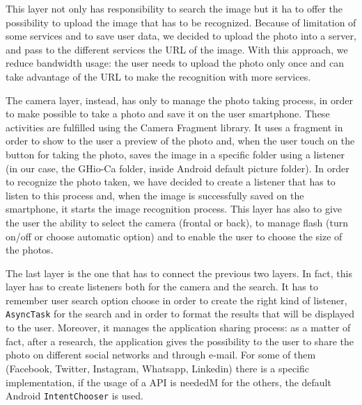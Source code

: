 This layer not only has responsibility to search the image but it ha to offer the possibility to upload the image that has to be recognized. Because of limitation of some services and to save user data, we decided to upload the photo into a server, and pass to the different services the URL of the image. With this approach, we reduce bandwidth usage: the user needs to upload the photo only once and can take advantage of the URL to make the recognition with more services.

The camera layer, instead, has only to manage the photo taking process, in order to make possible to take a photo and save it on the user smartphone. These activities are fulfilled using the Camera Fragment library. It uses a fragment in order to show to the user a preview of the photo and, when the user touch on the button for taking the photo, saves the image in a specific folder using a listener (in our case, the GHio-Ca folder, inside Android default picture folder). In order to recognize the photo taken, we have decided to create a listener that has to listen to this process and, when the image is successfully saved on the smartphone, it starts the image recognition process. 
This layer has also to give the user the ability to select the camera (frontal or back), to manage flash (turn on/off or choose automatic option) and to enable the user to choose the size of the photos.

The last layer is the one that has to connect the previous two layers. In fact, this layer has to create listeners both for the camera and the search. \todo{}It has to remember user search option choose in order to create the right kind of listener, \texttt{AsyncTask} for the search and in order to format the results that will be displayed to the user. Moreover, it manages the application sharing process: as a matter of fact, after a research, the application gives the possibility to the user to share the photo on different social networks and through e-mail. For some of them (Facebook, Twitter, Instagram, Whatsapp, Linkedin) there is a specific implementation, if the usage of a API is neededM for the others, the default Android \texttt{IntentChooser} is used. 